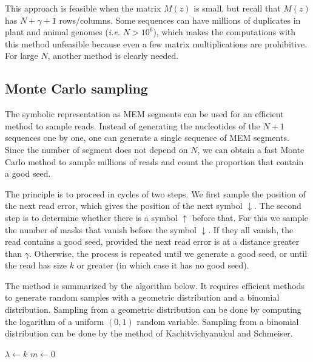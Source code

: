 \documentclass{article}
\begin{document}
This approach is feasible when the matrix $M(z)$ is small, but recall that
$M(z)$ has $N+\gamma+1$ rows/columns. Some sequences can have millions of
duplicates in plant and animal genomes (\textit{i.e.} $N > 10^6$), which
makes the computations with this method unfeasible because even a few
matrix multiplications are prohibitive. For large $N$, another method is
clearly needed.


\subsection{Monte Carlo sampling}

The symbolic representation as MEM segments can be used for an efficient
method to sample reads. Instead of generating the nucleotides of the $N+1$
sequences one by one, one can generate a single sequence of MEM segments.
Since the number of segment does not depend on $N$, we can obtain a fast
Monte Carlo method to sample millions of reads and count the proportion
that contain a good seed.

The principle is to proceed in cycles of two steps. We first sample the
position of the next read error, which gives the position of the next
symbol $\downarrow$. The second step is to determine whether there is a
symbol $\uparrow$ before that. For this we sample the number of masks that
vanish before the symbol $\downarrow$. If they all vanish, the read
contains a good seed, provided the next read error is at a distance
greater than $\gamma$. Otherwise, the process is repeated until we
generate a good seed, or until the read has size $k$ or greater (in which
case it has no good seed).

The method is summarized by the algorithm below. It requires efficient
methods to generate random samples with a geometric distribution and a
binomial distribution. Sampling from a geometric distribution can be done
by computing the logarithm of a uniform $(0,1)$ random variable. Sampling
from a binomial distribution can be done by the method of
Kachitvichyanukul and Schmeiser\cite{kachitvichyanukul1988binomial}.

\begin{algorithm}[H]
\label{alg:mcmc}
\SetAlgoLined
{}
  $\lambda \leftarrow k$ 
  $m \leftarrow 0$ 
\end{algorithm}
\end{document}
